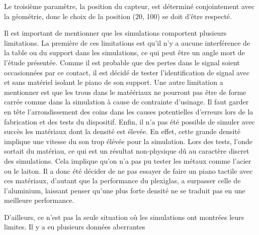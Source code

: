 \documentclass[conference]{IEEEtran}
\begin{document}
Le troisième paramètre, la position du capteur, est déterminé conjointement avec 
la géométrie, donc le choix de la position (20, 100) se doit d'être respecté. 

Il est important de mentionner que les simulations comportent plusieurs limitations.
La première de ces limitations est qu'il n'y a aucune interférence de la table ou 
du support dans les simulations, ce qui peut être un angle mort de l'étude présentée.
Comme il est probable que des pertes dans le signal soient occasionnées par ce
contact, il est décidé de tester l'identification de signal avec et sans matériel 
isolant le piano de son support. Une autre limitation a mentionner est que les trous
dans le matéériaux ne pourront pas être de forme carrée comme dans la simulation à 
cause de contrainte d'usinage. Il faut garder en tête l'arrondissement des coins dans
les causes potentielles d'erreurs lors de la fabrication et des tests du dispositif.
Enfin, il n'a pas été possible de simuler avec succès les matériaux dont la densité
est élevée. En effet, cette grande densité implique une vitesse du son trop élévée
pour la simulation. Lors des tests, l'onde sortait du matériau, ce qui est un résultat
non-physique dû au caractère discret des simulations. Cela implique qu'on n'a pas pu 
tester les métaux comme l'acier ou le laiton. Il a donc été décider de ne pas essayer
de faire un piano tactile avec ces matériaux, d'autant que la performance du plexiglas,
a surpasser celle de l'aluminium, laissant penser qu'une plus forte densité ne se 
traduit pas en une meilleure performance.

D'ailleurs, ce n'est pas la seule situation où les simulations ont montrées leurs 
limites. Il y a eu plusieurs données aberrantes 

\clearpage

% 
% 
\end{document}
